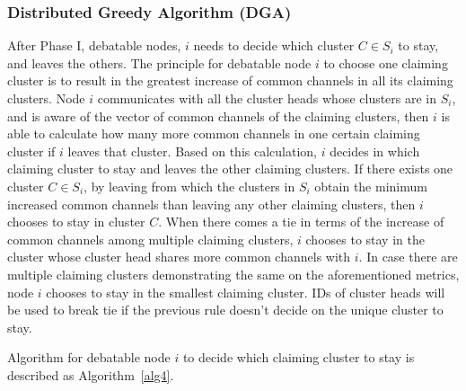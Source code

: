 
\subsubsection*{Distributed Greedy Algorithm (DGA)}
After Phase I, debatable nodes, \eg $i$ needs to decide which cluster $C\in S_i$ to stay, and leaves the others.
The principle for debatable node $i$ to choose one claiming cluster is to result in the greatest increase of common channels in all its claiming clusters.
Node $i$ communicates with all the cluster heads whose clusters are in $S_i$, and is aware of the vector of common channels of the claiming clusters, then $i$ is able to calculate how many more common channels in one certain claiming cluster if $i$ leaves that cluster.
Based on this calculation, $i$ decides in which claiming cluster to stay and leaves the other claiming clusters.
If there exists one cluster $C\in S_i$, by leaving from which the clusters in $S_i$ obtain the minimum increased common channels than leaving any other claiming clusters, then $i$ chooses to stay in cluster $C$.
When there comes a tie in terms of the increase of common channels among multiple claiming clusters, $i$ chooses to stay in the cluster whose cluster head shares more common channels with $i$.
In case there are multiple claiming clusters demonstrating the same on the aforementioned metrics, node $i$ chooses to stay in the smallest claiming cluster.
IDs of cluster heads will be used to break tie if the previous rule doesn't decide on the unique cluster to stay.

Algorithm for debatable node $i$ to decide which claiming cluster to stay is described as Algorithm~\ref{alg4}.

